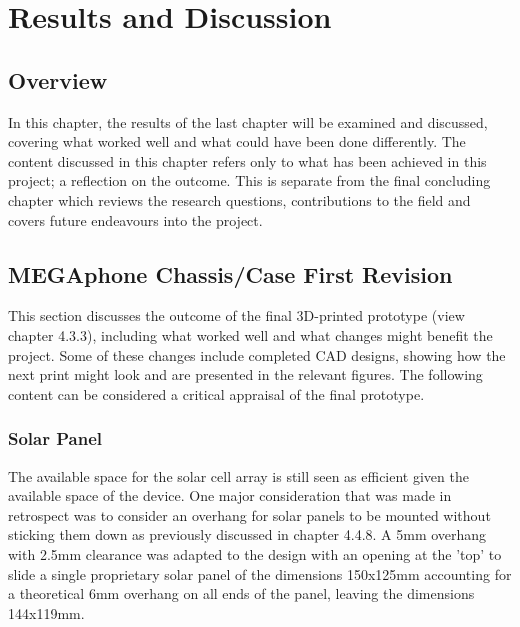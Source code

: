 
\chapter{Results and Discussion} %

\label{Chapter5} %


\section{Overview}
In this chapter, the results of the last chapter will be examined and discussed, covering what worked well and what could have been done differently.
The content discussed in this chapter refers only to what has been achieved in this project; a reflection on the outcome.
This is separate from the final concluding chapter which reviews the research questions, contributions to the field and covers future endeavours into the project.


\section{MEGAphone Chassis/Case First Revision}
This section discusses the outcome of the final 3D-printed prototype (view chapter 4.3.3), including what worked well and what changes might benefit the project.
Some of these changes include completed CAD designs, showing how the next print might look and are presented in the relevant figures.
The following content can be considered a critical appraisal of the final prototype.

\subsection{Solar Panel}

The available space for the solar cell array is still seen as efficient given the available space of the device.
One major consideration that was made in retrospect was to consider an overhang for solar panels to be mounted without sticking them down as previously discussed in chapter 4.4.8.
A 5mm overhang with 2.5mm clearance was adapted to the design with an opening at the 'top' to slide a single proprietary solar panel of the dimensions 150x125mm accounting for a theoretical 6mm overhang on all ends of the panel, leaving the dimensions 144x119mm.

